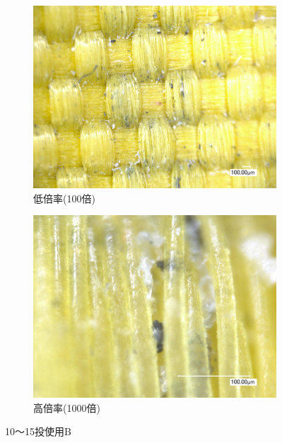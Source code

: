 \documentclass[main]{subfiles}
\begin{document}
\begin{figure}[H]
    \centering
    \begin{subfigure}[htbp]{0.45\linewidth}
        \centering
        \includegraphics[keepaspectratio, width=0.8\linewidth]{figures/縁/カーリングパッド10-15低倍率B.jpg}
        \caption{低倍率(100倍)}
        \label{fig:label}
    \end{subfigure}
    \begin{subfigure}[htbp]{0.45\linewidth}
        \centering
        \includegraphics[keepaspectratio, width=0.8\linewidth]{figures/縁/カーリングパッド10-15B.jpg}
        \caption{高倍率(1000倍)}
        \label{fig:label}
    \end{subfigure}
    \caption{10～15投使用B}
    \label{fig:label}
\end{figure}
\end{document}
